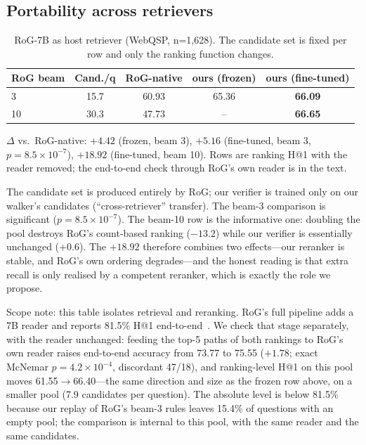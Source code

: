 \documentclass[sigconf,review]{acmart}
\begin{document}
\subsection{Portability across retrievers}
\label{sec:portable-results}

\begin{table}[t]
\centering\footnotesize
\caption{RoG-7B as host retriever (WebQSP, n=1,628). The candidate set is fixed per row and only the ranking function changes.}
\label{tab:pluggable}
\begin{tabular}{lcccc}
\toprule
RoG beam & Cand./q & RoG-native & ours (frozen) & ours (fine-tuned) \\
\midrule
3 & 15.7 & 60.93 & 65.36 & \textbf{66.09} \\
10 & 30.3 & 47.73 & -- & \textbf{66.65} \\
\bottomrule
\end{tabular}
\par\vspace{3pt}
\footnotesize $\Delta$ vs.\ RoG-native: $+4.42$ (frozen, beam 3), $+5.16$ (fine-tuned, beam 3, $p=8.5\times10^{-7}$), $+18.92$ (fine-tuned, beam 10). Rows are ranking H@1 with the reader removed; the end-to-end check through RoG's own reader is in the text.
\end{table}

The candidate set is produced entirely by RoG; our verifier is trained only on our walker's candidates (``cross-retriever'' transfer). The beam-3 comparison is significant ($p=8.5\times10^{-7}$). The beam-10 row is the informative one: doubling the pool destroys RoG's count-based ranking ($-13.2$) while our verifier is essentially unchanged ($+0.6$). The $+18.92$ therefore combines two effects---our reranker is stable, and RoG's own ordering degrades---and the honest reading is that extra recall is only realised by a competent reranker, which is exactly the role we propose.

Scope note: this table isolates retrieval and reranking. RoG's full pipeline adds a 7B reader and reports 81.5\% H@1 end-to-end~\cite{luo2024rog}. We check that stage separately, with the reader unchanged: feeding the top-5 paths of both rankings to RoG's own reader raises end-to-end accuracy from 73.77 to 75.55 ($+1.78$; exact McNemar $p=4.2\times10^{-4}$, discordant 47/18), and ranking-level H@1 on this pool moves 61.55$\to$66.40---the same direction and size as the frozen row above, on a smaller pool (7.9 candidates per question). The absolute level is below 81.5\% because our replay of RoG's beam-3 rules leaves 15.4\% of questions with an empty pool; the comparison is internal to this pool, with the same reader and the same candidates.
\end{document}
